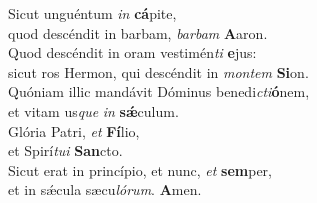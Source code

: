 \evenverse Sicut unguéntum \textit{in} \textbf{cá}pite,~\*\\
\evenverse quod descéndit in barbam, \textit{bar}\textit{bam} \textbf{A}aron.\\
\oddverse Quod descéndit in oram vestimén\textit{ti} \textbf{e}jus:~\*\\
\oddverse sicut ros Hermon, qui descéndit in \textit{mon}\textit{tem} \textbf{Si}on.\\
\evenverse Quóniam illic mandávit Dóminus benedi\textit{cti}\textbf{ó}nem,~\*\\
\evenverse et vitam us\textit{que} \textit{in} \textbf{sǽ}culum.\\
\oddverse Glória Patri, \textit{et} \textbf{Fí}lio,~\*\\
\oddverse et Spirí\textit{tu}\textit{i} \textbf{San}cto.\\
\evenverse Sicut erat in princípio, et nunc, \textit{et} \textbf{sem}per,~\*\\
\evenverse et in sǽcula sæcu\textit{ló}\textit{rum}. \textbf{A}men.\\
